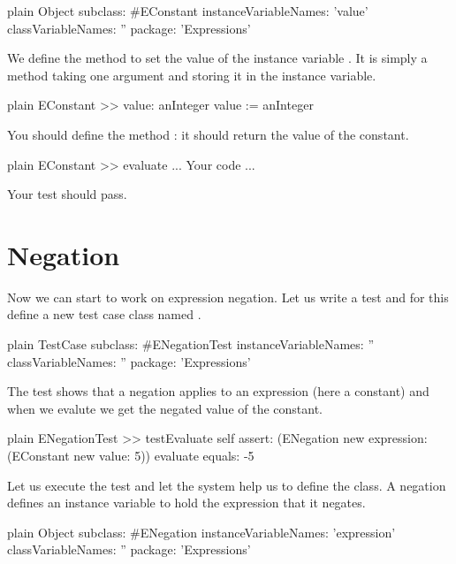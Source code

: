 \documentclass[10pt,twoside,english]{_support/latex/sbabook/sbabook}
\begin{document}
\begin{displaycode}{plain}
Object subclass: #EConstant
	instanceVariableNames: 'value'
	classVariableNames: ''
	package: 'Expressions'
\end{displaycode}

We define the method  to set the value of the instance variable .
It is simply a method taking one argument and storing it in the  instance variable.

\begin{displaycode}{plain}
EConstant >> value: anInteger
	value := anInteger
\end{displaycode}

You should define the method : it should return the value of the constant. 

\begin{displaycode}{plain}
EConstant >> evaluate
	... Your code ...
\end{displaycode}

Your test should pass. 
\section{Negation}
Now we can start to work on expression negation. Let us write a test and for this define a new test case class named . 

\begin{displaycode}{plain}
TestCase subclass: #ENegationTest
	instanceVariableNames: ''
	classVariableNames: ''
	package: 'Expressions'
\end{displaycode}

The test  shows that a negation applies to an expression (here a constant) and when we evalute we get the negated value of the constant. 

\begin{displaycode}{plain}
ENegationTest >> testEvaluate 
	self assert: (ENegation new expression: (EConstant new value: 5)) evaluate equals: -5
\end{displaycode}

Let us execute the test and let the system help us to define the class. A negation defines an instance variable to hold the expression that it negates.

\begin{displaycode}{plain}
Object subclass: #ENegation
	instanceVariableNames: 'expression'
	classVariableNames: ''
	package: 'Expressions'
\end{displaycode}
\end{document}
